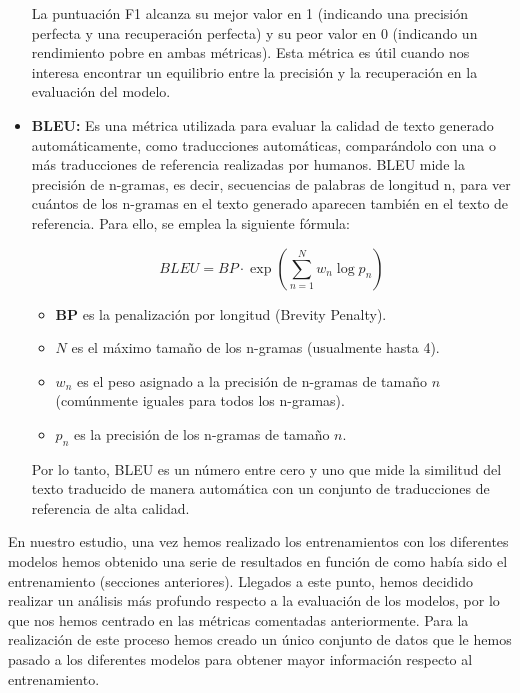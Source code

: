 \begin{itemize}
La puntuación F1 alcanza su mejor valor en 1 (indicando una precisión perfecta y una recuperación perfecta) y su peor valor en 0 (indicando un rendimiento pobre en ambas métricas). Esta métrica es útil cuando nos interesa encontrar un equilibrio entre la precisión y la recuperación en la evaluación del modelo.

\bigskip %

\item \textbf{\acrfull{BLEU}:} Es una métrica utilizada para evaluar la calidad de texto generado automáticamente, como traducciones automáticas, comparándolo con una o más traducciones de referencia realizadas por humanos. BLEU mide la precisión de n-gramas, es decir, secuencias de palabras de longitud n, para ver cuántos de los n-gramas en el texto generado aparecen también en el texto de referencia. Para ello, se emplea la siguiente fórmula:


\begin{equation}
BLEU = BP \cdot \exp \left( \sum_{n=1}^{N} w_n \log p_n \right)
\end{equation}

\begin{itemize}
    \item \textbf{BP} es la penalización por longitud (Brevity Penalty).
    \item \( N \) es el máximo tamaño de los n-gramas (usualmente hasta 4).
    \item \( w_n \) es el peso asignado a la precisión de n-gramas de tamaño \( n \) (comúnmente iguales para todos los n-gramas).
    \item \( p_n \) es la precisión de los n-gramas de tamaño \( n \).
\end{itemize}

Por lo tanto, \acrshort{BLEU} es un número entre cero y uno que mide la similitud del texto traducido de manera automática con un conjunto de traducciones de referencia de alta calidad.

\end{itemize}

En nuestro estudio, una vez hemos realizado los entrenamientos con los diferentes modelos hemos obtenido una serie de resultados en función de como había sido el entrenamiento (secciones anteriores). Llegados a este punto, hemos decidido realizar un análisis más profundo respecto a la evaluación de los modelos, por lo que nos hemos centrado en las métricas comentadas anteriormente. Para la realización de este proceso hemos creado un único conjunto de datos que le hemos pasado a los diferentes modelos para obtener mayor información respecto al entrenamiento.

